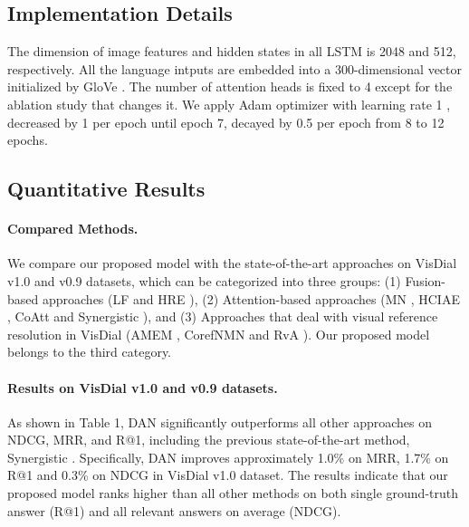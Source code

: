 \documentclass[11pt,a4paper]{article}
\begin{document}
\subsection{Implementation Details}
\label{sec:impdet}
The dimension of image features  and hidden states in all LSTM  is 2048 and 512, respectively. All the language intputs are embedded into a 300-dimensional vector initialized by GloVe \cite{pennington2014glove}. The number of attention heads  is fixed to 4 except for the ablation study that changes it. We apply Adam optimizer \cite{kingma2014adam} with learning rate 1 , decreased by 1  per epoch until epoch 7, decayed by 0.5 per epoch from 8 to 12 epochs.

\subsection{Quantitative Results}
\label{sec:quan}
\paragraph{Compared Methods.} We compare our proposed model with the state-of-the-art approaches on VisDial v1.0 and v0.9 datasets, which can be categorized into three groups: (1) Fusion-based approaches (LF and HRE \cite{das2017visual}), (2) Attention-based approaches (MN \cite{das2017visual}, HCIAE \cite{lu2017best}, CoAtt \cite{wu2018you} and Synergistic \cite{guo2019image}), and (3) Approaches that deal with visual reference resolution in VisDial (AMEM \cite{seo2017visual}, CorefNMN \cite{kottur2018visual} and RvA \cite{niu2018recursive}). Our proposed model belongs to the third category.

\paragraph{Results on VisDial v1.0 and v0.9 datasets.} As shown in Table 1, DAN significantly outperforms all other approaches on NDCG, MRR, and R@1, including the previous state-of-the-art method, Synergistic \cite{guo2019image}. Specifically, DAN improves approximately 1.0\% on MRR, 1.7\% on R@1 and 0.3\% on NDCG in VisDial v1.0 dataset. The results indicate that our proposed model ranks higher than all other methods on both single ground-truth answer (R@1) and all relevant answers on average (NDCG).
\end{document}
